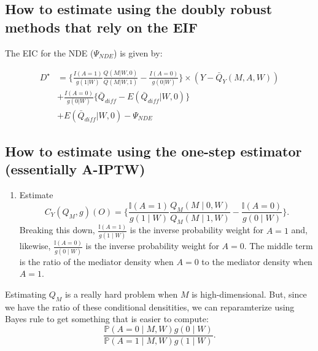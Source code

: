 \documentclass[
  12pt,
]{book}
\providecommand{\tightlist}{%
  \setlength{\itemsep}{0pt}\setlength{\parskip}{0pt}}
\theoremstyle{definition}
\theoremstyle{definition}
\theoremstyle{definition}
\renewcommand{\P}{\mathbb{P}}
\newcommand{\I}{\mathbb{I}}
\newcommand{\1}{\mathbbm{1}}
\begin{document}
\hypertarget{how-to-estimate-using-the-doubly-robust-methods-that-rely-on-the-eif}{%
\subsection{How to estimate using the doubly robust methods that rely on the EIF}\label{how-to-estimate-using-the-doubly-robust-methods-that-rely-on-the-eif}}

The EIC for the NDE (\(\Psi_{NDE}\)) is given by:

\begin{align}
    D^{\star} &= \bigg\{ \frac{I(A=1)}{g(1|W)}\frac{Q(M|W,0)}{Q(M|W,1)} -
      \frac{I(A=0)}{g(0|W)}\bigg\} \times (Y-\bar{Q}_Y(M,A,W))  \\
    &+ \frac{I(A=0)}{g(0|W)}\{ \bar{Q}_{diff} - E(\bar{Q}_{diff} | W,0) \}\\
    &+ E(\bar{Q}_{diff} | W,0) - \Psi_{NDE}
\end{align}

\hypertarget{how-to-estimate-using-the-one-step-estimator-essentially-a-iptw}{%
\subsection{How to estimate using the one-step estimator (essentially A-IPTW)}\label{how-to-estimate-using-the-one-step-estimator-essentially-a-iptw}}

\begin{enumerate}
\def\labelenumi{\arabic{enumi}.}
\tightlist
\item
  Estimate
  \begin{equation*}
   C_Y(Q_M, g)(O) = \Bigg\{\frac{\I(A = 1)}{g(1 \mid W)}
     \frac{Q_M(M \mid 0, W)}{Q_M(M \mid 1, W)} -
     \frac{\I(A = 0)}{g(0 \mid W)} \Bigg\}.
    \end{equation*}
  Breaking this down, \(\frac{\I(A = 1)}{g(1 \mid W)}\) is the inverse probability
  weight for \(A = 1\) and, likewise, \(\frac{\I(A = 0)}{g(0 \mid W)}\) is the inverse
  probability weight for \(A = 0\). The middle term is the ratio of the mediator
  density when \(A = 0\) to the mediator density when \(A = 1\).
\end{enumerate}

Estimating \(Q_M\) is a really hard problem when \(M\) is high-dimensional. But,
since we have the ratio of these conditional densitities, we can reparamterize
using Bayes rule to get something that is easier to compute:
\begin{equation*}
  \frac{\P(A = 0 \mid M, W) g(0 \mid W)}{\P(A = 1 \mid M, W) g(1 \mid W)}.
\end{equation*}
\end{document}

